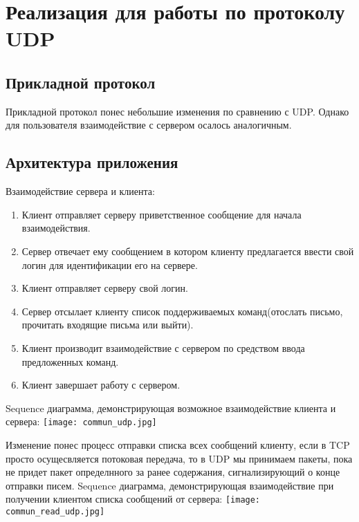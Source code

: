 \documentclass[12pt,a4paper]{report}
\begin{document}
\chapter{Реализация для работы по протоколу UDP}
\section{Прикладной протокол}
Прикладной протокол понес небольшие изменения по сравнению с UDP. Однако для пользователя взаимодействие с сервером осалось аналогичным.


\section{Архитектура приложения}
Взаимодействие сервера и клиента:
\begin{enumerate}
\item Клиент отправляет серверу приветственное сообщение для начала взаимодействия.
\item Сервер отвечает ему сообщением в котором клиенту предлагается ввести свой логин для идентификации его на сервере.
\item Клиент отправляет серверу свой логин.
\item Сервер отсылает клиенту список поддерживаемых команд(отослать письмо, прочитать входящие письма или выйти).
\item Клиент производит взаимодействие с сервером по средством ввода предложенных команд.
\item Клиент завершает работу с сервером.
\end{enumerate}

Sequence диаграмма, демонстрирующая возможное взаимодействие клиента и сервера:
\linebreak
\center \texttt{[image: commun\_udp.jpg]}
\flushleft

Изменение понес процесс отправки списка всех сообщений клиенту, если в TCP просто осущесвляется потоковая передача, то в UDP мы принимаем пакеты, пока не придет пакет определнного за ранее содержания, сигнализирующий о конце отправки писем.
\linebreak
\linebreak
Sequence диаграмма, демонстрирующая взаимодействие при получении клиентом списка сообщений от сервера:
\linebreak
\center \texttt{[image: commun\_read\_udp.jpg]}
\flushleft
\end{document}
